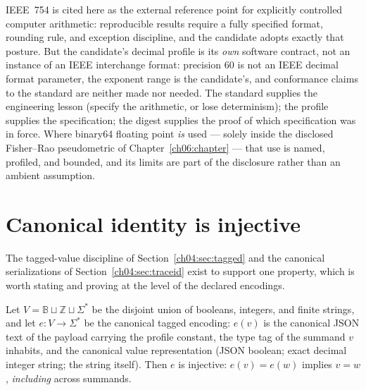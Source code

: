 \begin{remark}\label{ch04:rem:ieee}
IEEE~754 \cite{ieee754} is cited here as the external reference point for
explicitly controlled computer arithmetic: reproducible results require a
fully specified format, rounding rule, and exception discipline, and the
candidate adopts exactly that posture. But the candidate's decimal profile
is its \emph{own} software contract, not an instance of an IEEE
interchange format: precision $60$ is not an IEEE decimal format
parameter, the exponent range is the candidate's, and conformance claims
to the standard are neither made nor needed. The standard supplies the
engineering lesson (specify the arithmetic, or lose determinism); the
profile supplies the specification; the digest supplies the proof of which
specification was in force. Where binary64 floating point \emph{is} used
--- solely inside the disclosed Fisher--Rao pseudometric of
Chapter~\ref{ch06:chapter} --- that use is named, profiled, and bounded,
and its limits are part of the disclosure rather than an ambient
assumption.
\end{remark}

\section{Canonical identity is injective}\label{ch04:sec:injective}

The tagged-value discipline of Section~\ref{ch04:sec:tagged} and the
canonical serializations of Section~\ref{ch04:sec:traceid} exist to
support one property, which is worth stating and proving at the level of
the declared encodings.

\begin{proposition}
\label{ch04:prop:injective}
Let $V = \mathbb{B} \sqcup \mathbb{Z} \sqcup \Sigma^{*}$ be the disjoint
union of booleans, integers, and finite strings, and let
$e : V \to \Sigma^{*}$ be the canonical tagged encoding: $e(v)$ is the
canonical JSON text of the payload carrying the profile constant, the type
tag of the summand $v$ inhabits, and the canonical value representation
(JSON boolean; exact decimal integer string; the string itself). Then $e$
is injective: $e(v) = e(w)$ implies $v = w$, \emph{including} across
summands.
\end{proposition}

